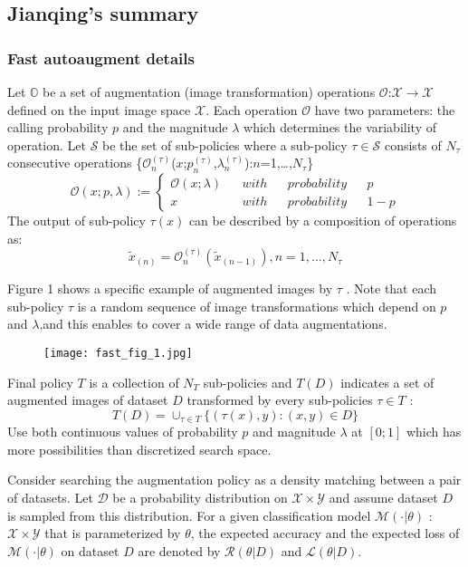 \subsection{Jianqing's summary}
\subsubsection{Fast autoaugment details}
Let $\mathbb{O}$ be a set of augmentation (image transformation) operations
$\mathcal{O}$:$\mathcal{X}\rightarrow\mathcal{X}$ defined on the input image space $\mathcal{X}$. Each operation $\mathcal{O}$ have two parameters: the calling probability $p$ and the magnitude $\lambda$ which determines the variability of operation. Let $\mathcal{S}$ be the set of sub-policies where a sub-policy $\tau \in \mathcal{S}$ consists of $N_{\tau}$ consecutive operations
\{$\mathcal{O}_n^{(\tau)}$($x$;$p_n^{(\tau)}$,$\lambda_n^{(\tau)}$):$n$=1,\ldots,$N_\tau$\}
$$\mathcal{O}(x;p,\lambda):=\left\{
\begin{aligned}
\mathcal{O}(x;\lambda) &&with&&probability&& p \\
x&&with&&probability&&1-p
\end{aligned}
\right.
$$
The output of sub-policy $\tau(x)$ can be described by a composition of operations as:\\
\begin{equation}
\tilde{x}_{(n)}=\mathcal{O}_n^{(\tau)}(\tilde{x}_{(n-1)}),n=1,\ldots,N_{\tau}
\end{equation}

Figure 1 shows a specific example of augmented images by $\tau$ .
Note that each sub-policy $\tau$ is a random sequence of image transformations which depend on $p$ and $\lambda$,and this enables to cover a wide range of data augmentations.
\begin{figure}[H]
	\centering
	\texttt{[image: fast\_fig\_1.jpg]}
\end{figure}

Final policy $T$ is a collection of $N_T$ sub-policies and $T(D)$ indicates a set of augmented images of dataset $D$ transformed by every
sub-policies $\tau\in T$ :
\begin{equation}
T(D)=\cup_{\tau \in T}\{(\tau(x),y):(x,y)\in D\}
\end{equation}
Use both continuous values of probability $p$ and magnitude $\lambda$ at $[0; 1]$ which has more possibilities than discretized search space.


Consider searching the augmentation policy as a density matching between
a pair of datasets. Let $\mathcal{D}$ be a probability distribution on $\mathcal{X}\times\mathcal{Y}$ and assume dataset $D$ is sampled
from this distribution. For a given classification model $\mathcal{M}(\cdot|\theta)$ : $\mathcal{X}\times\mathcal{Y}$ that is parameterized by $\theta$, the expected accuracy and the expected loss of $\mathcal{M}(\cdot|\theta)$ on dataset $D$ are denoted by $\mathcal{R}(\theta |D)$ and $\mathcal{L}(\theta |D)$.

